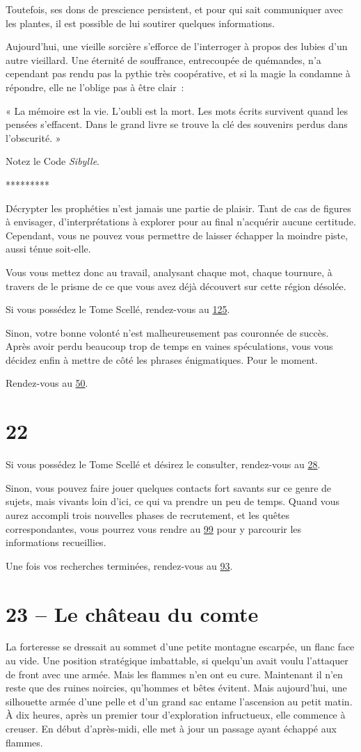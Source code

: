 \documentclass{report}
\newcommand{\gsection}[1]{
    \section{#1}
    \label{section-#1}
}
\newcommand{\glink}[1]{\hyperref[section-#1]{#1}}
\newcommand{\ellipse}{
    \begin{center}
        *********
    \end{center}
}
\begin{document}
Toutefois, ses dons de prescience persistent, et pour qui sait communiquer avec les plantes, il est possible de lui soutirer quelques informations.

Aujourd'hui, une vieille sorcière s'efforce de l'interroger à propos des lubies d'un autre vieillard. Une éternité de souffrance, entrecoupée de quémandes, n'a cependant pas rendu pas la pythie très coopérative, et si la magie la condamne à répondre, elle ne l'oblige pas à être clair :

« La mémoire est la vie. L'oubli est la mort. Les mots écrits survivent quand les pensées s'effacent. Dans le grand livre se trouve la clé des souvenirs perdus dans l'obscurité. »

Notez le Code \emph{Sibylle}.

\ellipse

Décrypter les prophéties n'est jamais une partie de plaisir. Tant de cas de figures à envisager, d'interprétations à explorer pour au final n'acquérir aucune certitude. Cependant, vous ne pouvez vous permettre de laisser échapper la moindre piste, aussi ténue soit-elle.

Vous vous mettez donc au travail, analysant chaque mot, chaque tournure, à travers de le prisme de ce que vous avez déjà découvert sur cette région désolée.

Si vous possédez le Tome Scellé, rendez-vous au \glink{125}.

Sinon, votre bonne volonté n'est malheureusement pas couronnée de succès. Après avoir perdu beaucoup trop de temps en vaines spéculations, vous vous décidez enfin à mettre de côté les phrases énigmatiques. Pour le moment.

Rendez-vous au \glink{50}.

\gsection{22}

Si vous possédez le Tome Scellé et désirez le consulter, rendez-vous au \glink{28}.

Sinon, vous pouvez faire jouer quelques contacts fort savants sur ce genre de sujets, mais vivants loin d'ici, ce qui va prendre un peu de temps. Quand vous aurez accompli trois nouvelles phases de recrutement, et les quêtes correspondantes, vous pourrez vous rendre au \glink{99} pour y parcourir les informations recueillies.

Une fois vos recherches terminées, rendez-vous au \glink{93}.

\gsection{23 – Le château du comte}

La forteresse se dressait au sommet d'une petite montagne escarpée, un flanc face au vide. Une position stratégique imbattable, si quelqu'un avait voulu l'attaquer de front avec une armée. Mais les flammes n'en ont eu cure. Maintenant il n'en reste que des ruines noircies, qu'hommes et bêtes évitent. Mais aujourd'hui, une silhouette armée d'une pelle et d'un grand sac entame l'ascension au petit matin. À dix heures, après un premier tour d'exploration infructueux, elle commence à creuser. En début d'après-midi, elle met à jour un passage ayant échappé aux flammes.
\end{document}
